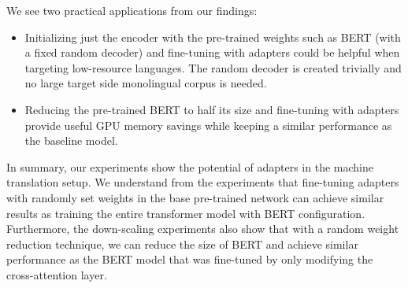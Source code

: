 We see two practical applications from our findings:
\begin{itemize}
    \item Initializing just the encoder with the pre-trained weights such as BERT (with a fixed random decoder) and fine-tuning with adapters could be helpful when targeting low-resource languages. The random decoder is created trivially and no large target side monolingual corpus is needed.
    \item Reducing the pre-trained BERT to half its size and fine-tuning with adapt\-ers provide useful GPU memory savings while keeping a similar performance as the baseline model.
\end{itemize}

In summary, our experiments show the potential of adapters in the machine translation setup. We understand from the experiments that fine-tuning adapters with randomly set weights in the base pre-trained network can achieve similar results as training the entire transformer model with BERT configuration. Furthermore, the down-scaling experiments also show that with a random weight reduction technique, we can reduce the size of BERT and achieve similar performance as the BERT model that was fine-tuned by only modifying the cross-attention layer.